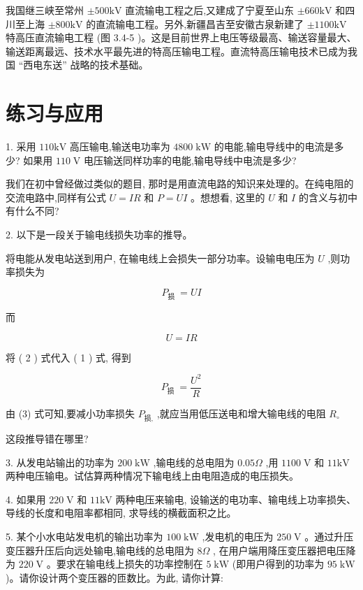 \documentclass[10pt]{article}
\begin{document}
我国继三峡至常州 \(\pm {500}\mathrm{{kV}}\) 直流输电工程之后,又建成了宁夏至山东 \(\pm {660}\mathrm{{kV}}\) 和四川至上海 \(\pm {800}\mathrm{{kV}}\) 的直流输电工程。另外,新疆昌吉至安徽古泉新建了 \(\pm {1100}\mathrm{{kV}}\) 特高压直流输电工程 (图 3.4-5 )。这是目前世界上电压等级最高、输送容量最大、输送距离最远、技术水平最先进的特高压输电工程。直流特高压输电技术已成为我国 “西电东送” 战略的技术基础。

\section*{练习与应用}

1. 采用 \({110}\mathrm{{kV}}\) 高压输电,输送电功率为 \({4800}\mathrm{\;{kW}}\) 的电能,输电导线中的电流是多少? 如果用 \({110}\mathrm{\;V}\) 电压输送同样功率的电能,输电导线中电流是多少?

我们在初中曾经做过类似的题目, 那时是用直流电路的知识来处理的。在纯电阻的交流电路中,同样有公式 \(U = {IR}\) 和 \(P = {UI}\) 。想想看, 这里的 \(U\) 和 \(I\) 的含义与初中有什么不同?

2. 以下是一段关于输电线损失功率的推导。

将电能从发电站送到用户, 在输电线上会损失一部分功率。设输电电压为 \(U\) ,则功率损失为

\[
{P}_{\text{损 }} = {UI} \tag{1}
\]

而

\[
U = {IR} \tag{（2）}
\]

将 ( 2 ) 式代入 ( 1 ) 式, 得到

\[
{P}_{\text{损 }} = \frac{{U}^{2}}{R} \tag{3}
\]

由 (3) 式可知,要减小功率损失 \({P}_{\text{损,}}\) ,就应当用低压送电和增大输电线的电阻 \({R}_{ \circ }\)

这段推导错在哪里?

3. 从发电站输出的功率为 \({200}\mathrm{\;{kW}}\) ,输电线的总电阻为 \({0.05\Omega }\) ,用 \({1100}\mathrm{\;V}\) 和 \({11}\mathrm{{kV}}\) 两种电压输电。试估算两种情况下输电线上由电阻造成的电压损失。

4. 如果用 \({220}\mathrm{\;V}\) 和 \({11}\mathrm{{kV}}\) 两种电压来输电, 设输送的电功率、输电线上功率损失、导线的长度和电阻率都相同, 求导线的横截面积之比。

5. 某个小水电站发电机的输出功率为 \({100}\mathrm{\;{kW}}\) ,发电机的电压为 \({250}\mathrm{\;V}\) 。通过升压变压器升压后向远处输电,输电线的总电阻为 \({8\Omega }\) , 在用户端用降压变压器把电压降为 \({220}\mathrm{\;V}\) 。要求在输电线上损失的功率控制在 \(5\mathrm{\;{kW}}\) (即用户得到的功率为 \({95}\mathrm{\;{kW}}\) )。请你设计两个变压器的匝数比。为此, 请你计算:
\end{document}
